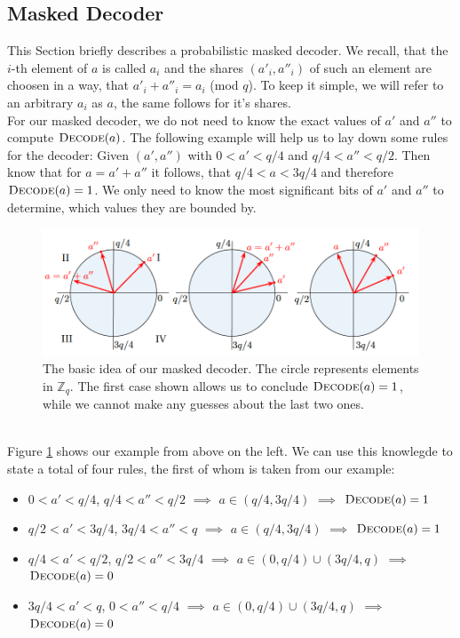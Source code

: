 \subsection{Masked Decoder}
This Section briefly describes a probabilistic masked decoder. We recall, that the \(i\)-th element of \(\textit{a}\) is called \(a_i\) and the shares \((a'_i,a''_i)\) of such an element are choosen in a way, that \(a'_i + a''_i = a_i\) (mod \(q\)). To keep it simple, we will refer to an arbitrary \(a_i\) as \(a\), the same follows for it's shares.\\
For our masked decoder, we do not need to know the exact values of \(a'\) and \(a''\) to compute \(\textsc{Decode}(a)\). The following example will help us to lay down some rules for the decoder: Given \((a', a'')\) with \(0 < a' < q/4\) and \(q/4 < a'' < q/2\). Then know that for \(a=a'+a''\) it follows, that \(q/4 < a < 3q/4\) and therefore \(\textsc{Decode}(a)=1\). We only need to know the most significant bits of \(a'\) and \(a''\) to determine, which values they are bounded by.
\begin{figure}
	\includegraphics[width=\textwidth]{maskedDecoder_1.png}
	\caption{The basic idea of our masked decoder. The circle represents elements in \(\mathbb{Z}_q\). The first case shown allows us to conclude \(\textsc{Decode}(a)=1\), while we cannot make any guesses about the last two ones.}
	\label{maskedDecoder_1}
\end{figure}
\\Figure \ref{maskedDecoder_1} shows our example from above on the left. We can use this knowlegde to state a total of four rules, the first of whom is taken from our example:
\begin{itemize}
\item \(0 < a' < q/4\), \(q/4 < a'' < q/2\) \(\implies\) \(a \in (q/4,3q/4)\) \(\implies\) \(\textsc{Decode}(a)=1\)
\item \(q/2 < a' < 3q/4\), \(3q/4 < a'' < q\) \(\implies\) \(a \in (q/4,3q/4)\) \(\implies\) \(\textsc{Decode}(a)=1\)
\item \(q/4 < a' < q/2\), \(q/2 < a'' < 3q/4\) \(\implies\) \(a \in (0,q/4) \cup (3q/4,q)\) \(\implies\) \(\textsc{Decode}(a)=0\)
\item \(3q/4 < a' < q\), \(0 < a'' < q/4\) \(\implies\) \(a \in (0,q/4) \cup (3q/4,q)\) \(\implies\) \(\textsc{Decode}(a)=0\)
\end{itemize}
